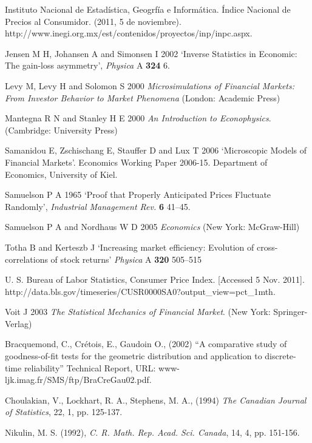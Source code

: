 \documentclass[a4paper]{jpconf}
\begin{document}
\begin{thebibliography}{15}
Instituto Nacional de Estad\'istica, Geogrf\'ia e Inform\'atica. \'Indice Nacional de Precios al Consumidor. (2011, 5 de noviembre). http://www.inegi.org.mx/est/contenidos/proyectos/inp/inpc.aspx.

Jensen M H, Johansen A and Simonsen I 2002 `Inverse Statistics in Economic: The gain-loss asymmetry', {\it Physica} A {\bf 324} 6.

Levy M, Levy H and Solomon S 2000 {\it Microsimulations of Financial Markets: From Investor Behavior to Market Phenomena} (London: Academic Press)

Mantegna R N and Stanley H E 2000 {\it An Introduction to Econophysics}. (Cambridge: University Press)

Samanidou E, Zschischang E, Stauffer D and Lux T 2006 `Microscopic Models of Financial Markets'. Economics Working Paper 2006-15. Department of Economics, University of Kiel.

Samuelson P A 1965 ‘Proof that Properly Anticipated Prices Fluctuate Randomly’, {\it Industrial Management Rev.} {\bf 6} 41--45.

Samuelson P A and Nordhaus W D 2005 {\it Economics} (New York: McGraw-Hill)

Totha B and Kerteszb J `Increasing market efficiency: Evolution of cross-correlations of stock returns' {\it Physica} A {\bf 320} 505--515

U. S. Bureau of Labor Statistics, Consumer Price Index. [Accessed 5 Nov. 2011]. http://data.bls.gov/timeseries/CUSR0000SA0?output\_view=pct\_1mth.

Voit J 2003 {\it The Statistical Mechanics of Financial Market}. (New York: Springer-Verlag)

Bracquemond, C., Cr\'{e}tois, E., Gaudoin O., (2002)
``A comparative study of goodness-of-fit tests for the geometric distribution and application
to discrete-time reliability'' Technical Report, URL: www-ljk.imag.fr/SMS/ftp/BraCreGau02.pdf.

Choulakian, V., Lockhart, R. A., Stephens, M. A., (1994)
{\it The Canadian Journal of Statistics}, 22, 1, pp. 125-137. 

Nikulin, M. S. (1992),
{\it C. R. Math. Rep. Acad. Sci. Canada}, 14, 4, pp. 151-156.

\end{thebibliography}
\end{document}
